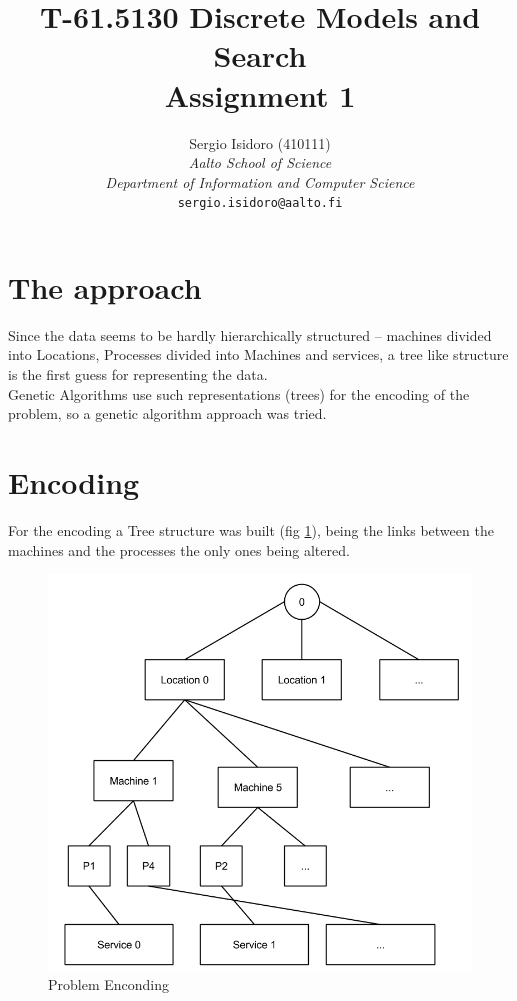 \documentclass[a4paper,10pt]{article}
\title{T-61.5130 Discrete Models and Search \\ Assignment 1}
\author{Sergio Isidoro (410111)\\
	   \textit{Aalto School of Science} \\ \textit{Department of Information and Computer Science}\\ 	   
       {\tt sergio.isidoro@aalto.fi}}
\begin{document}
\maketitle

\section{The approach}
Since the data seems to be hardly hierarchically structured -- machines divided into Locations, Processes divided into Machines and services, a tree like structure is the first guess for representing the data. \\
Genetic Algorithms use such representations (trees) for the encoding of the problem, so a genetic algorithm approach was tried.

\section{Encoding}
For the encoding a Tree structure was built (fig \ref{fig:enc}), being the links between the machines and the processes the only ones being altered.

\begin{figure} [h!]
	\begin{center}
	\includegraphics[scale=0.3]{Images/ProblemEncoding.png}
	\caption{Problem Enconding}
    \label{fig:enc}
    \end{center}       
\end{figure}
 
\end{document}
